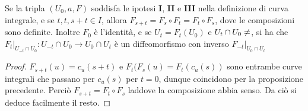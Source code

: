  \begin{proposition}
  Se la tripla $(U_0,a,F)$ soddisfa le ipotesi {\bf I}, {\bf II} e {\bf III} nella
  definizione di curva integrale, e se $t,t,s+t\in I$, allora $F_{s+t}=
  F_s\circ F_t=F_t\circ F_s$, dove le composizioni sono definite.
  Inoltre $F_0$ è l'identità, e se $U_t=F_t(U_0)$ e $U_t\cap U_0\ne\empty$, si ha
  che $F_t|_{U_{-t}\cap U_0}:U_{-t}\cap U_0\to U_0\cap U_t$ è un
  diffeomorfismo con inverso $F_{-t}|_{U_0\cap U_t}$
 \end{proposition}

 \begin{proof}
  $F_{s+t}(u)=c_u(s+t)$ e $F_t(F_s(u)=F_t(c_u(s))$ sono entrambe
  curve integrali che passano per $c_u(s)$ per $t=0$, dunque coincidono per la proposizione
  precedente. Perciò $F_{s+t}=F_t\circ F_s$ laddove la composizione
  abbia senso. Da ciò si deduce facilmente il resto.
 \end{proof}